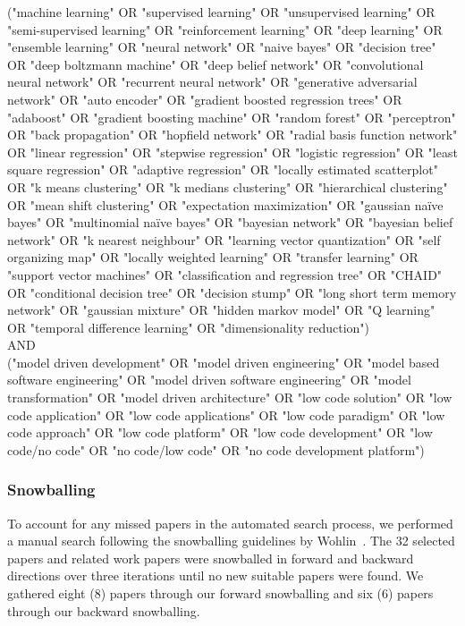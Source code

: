 \begin{center}
\begin{myframe}[width=45em,top=10pt,bottom=10pt,left=10pt,right=10pt,arc=10pt,auto outer arc,title=\centering\textbf{Search String}]
\footnotesize
\begin{center}
("machine learning" OR "supervised learning" OR "unsupervised learning" OR "semi-supervised
learning" OR "reinforcement learning" OR "deep learning" OR "ensemble learning" OR "neural network" OR
"naive bayes" OR "decision tree" OR "deep boltzmann machine" OR "deep belief network" OR "convolutional
neural network" OR "recurrent neural network" OR "generative adversarial network" OR "auto encoder"
OR "gradient boosted regression trees" OR "adaboost" OR "gradient boosting machine" OR "random forest"
OR "perceptron" OR "back propagation" OR "hopfield network" OR "radial basis function network" OR
"linear regression" OR "stepwise regression" OR "logistic regression" OR "least square regression" OR
"adaptive regression" OR "locally estimated scatterplot" OR "k means clustering" OR "k medians clustering"
OR "hierarchical clustering" OR "mean shift clustering" OR "expectation maximization" OR "gaussian naïve
bayes" OR "multinomial naïve bayes" OR "bayesian network" OR "bayesian belief network" OR "k nearest
neighbour" OR "learning vector quantization" OR "self organizing map" OR "locally weighted learning" OR
"transfer learning" OR "support vector machines" OR "classification and regression tree" OR "CHAID" OR
"conditional decision tree" OR "decision stump" OR "long short term memory network" OR "gaussian
mixture" OR "hidden markov model" OR "Q learning" OR "temporal difference learning" OR "dimensionality
reduction") \\ AND \\ ("model driven development" OR "model driven engineering" OR "model based software
engineering" OR "model driven software engineering" OR "model transformation" OR "model driven
architecture" OR "low code solution" OR "low code application" OR "low code applications" OR "low code
paradigm" OR "low code approach" OR "low code platform" OR "low code development" OR "low code/no
code" OR "no code/low code" OR "no code development platform")
        \end{center}
    \end{myframe}
\end{center}


\subsubsection{Snowballing}
To account for any missed papers in the automated search process, we performed a manual search following the snowballing guidelines by Wohlin~\cite{wohlin2014guidelines}. The 32 selected papers and related work papers were snowballed in forward and backward directions over three iterations until no new suitable papers were found. We gathered eight (8) papers through our forward snowballing and six (6) papers through our backward snowballing.

